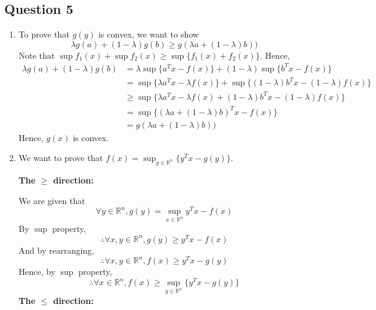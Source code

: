 \documentclass{article}
\newcommand{\R}{\mathbb{R}}
\begin{document}
\subsection*{Question 5}

\begin{enumerate}[label=(\roman*)]
\item To prove that $g(y)$ is convex, we want to show
    \[\lambda g(a) + (1-\lambda)g(b) \geq g(\lambda a + (1-\lambda)b))\]
    Note that $\sup f_1(x) + \sup f_2(x) \geq \sup \{f_1(x) + f_2(x)\}$. Hence,
    \begin{align*}
    \lambda g(a) + (1-\lambda)g(b) &=
    \lambda \sup \{a^T x - f(x)\} + (1-\lambda) \sup \{b^T x - f(x)\} \\
        &= \sup \{\lambda a^T x - \lambda f(x)\} + \sup \{(1-\lambda)b^T x - (1-\lambda)f(x)\} \\
        &\geq \sup \{\lambda a^T x - \lambda f(x) + (1-\lambda)b^T x - (1-\lambda)f(x)\} \\
        &= \sup\{(\lambda a + (1-\lambda)b)^T x - f(x) \} \\
        &= g(\lambda a + (1-\lambda)b))
    \end{align*}
    Hence, $g(x)$ is convex.
\item
    We want to prove that $f(x) = \sup_{y\in \R^n}\{ y^T x - g(y)\}$.
    
    \textbf{The $\geq$ direction:}
    
    We are given that
    \[\forall y \in \R^n, g(y) = \sup_{x \in \R^n} y^T x - f(x)\]
    By $\sup$ property,
    \[\therefore \forall x,y \in \R^n, g(y) \geq y^T x - f(x)\]
    And by rearranging,
    \[\therefore \forall x,y \in \R^n, f(x) \geq y^T x - g(y)\]
    Hence, by $\sup$ property,
    \[\therefore \forall x \in \R^n, f(x) \geq \sup_{y\in \R^n}\{ y^T x - g(y)\}\]
    \textbf{The $\leq$ direction:}
    

\end{enumerate}
\end{document}
